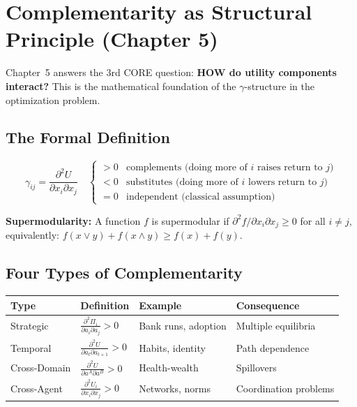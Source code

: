 \section{Complementarity as Structural Principle (Chapter 5)}
\label{sec:mp-complementarity}

Chapter~5 answers the 3rd CORE question: \textbf{HOW do utility components interact?}
This is the mathematical foundation of the $\gamma$-structure in the optimization problem.

\subsection{The Formal Definition}

\begin{equation}
\boxed{
\gamma_{ij} = \frac{\partial^2 U}{\partial x_i \partial x_j}
\quad \begin{cases}
> 0 & \text{complements (doing more of } i \text{ raises return to } j\text{)} \\
< 0 & \text{substitutes (doing more of } i \text{ lowers return to } j\text{)} \\
= 0 & \text{independent (classical assumption)}
\end{cases}
}
\label{eq:mp-gamma-def}
\end{equation}

\textbf{Supermodularity:} A function $f$ is supermodular if $\partial^2 f / \partial x_i \partial x_j \geq 0$ for all $i \neq j$, equivalently: $f(x \vee y) + f(x \wedge y) \geq f(x) + f(y)$.

\subsection{Four Types of Complementarity}

\begin{center}
\renewcommand{\arraystretch}{1.3}
\begin{tabular}{@{}llll@{}}
\toprule
\textbf{Type} & \textbf{Definition} & \textbf{Example} & \textbf{Consequence} \\
\midrule
Strategic & $\frac{\partial^2 \Pi_i}{\partial a_i \partial a_j} > 0$ & Bank runs, adoption & Multiple equilibria \\
Temporal & $\frac{\partial^2 U}{\partial a_t \partial a_{t+1}} > 0$ & Habits, identity & Path dependence \\
Cross-Domain & $\frac{\partial^2 U}{\partial a^A \partial a^B} > 0$ & Health-wealth & Spillovers \\
Cross-Agent & $\frac{\partial^2 U_i}{\partial x_i \partial x_j} > 0$ & Networks, norms & Coordination problems \\
\bottomrule
\end{tabular}
\end{center}

